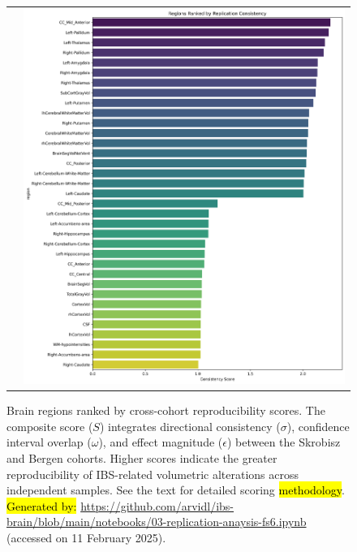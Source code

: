 \documentclass[diagnostics,article,accept,pdftex,moreauthors]{Definitions/mdpi}
\begin{document}
\begin{figure}[H]
\begin{tabular}{ll}
\hspace{-10mm} & \includegraphics[width=1\textwidth]{figs/Regions_Ranked_by_Replication_Consistency.png}
\end{tabular}
\caption{{{Brain regions ranked by cross-cohort reproducibility scores}}. {The composite score} 
 ($S$) integrates directional consistency ($\sigma$), confidence interval overlap ($\omega$), and effect magnitude ($\epsilon$) between the Skrobisz and Bergen cohorts. Higher scores indicate the greater reproducibility of IBS-related volumetric alterations across independent samples. See the text for detailed scoring \hl{methodology}. %
{\hl{Generated by:} {{\url{https://github.com/arvidl/ibs-brain/blob/main/notebooks/03-replication-anaysis-fs6.ipynb}}}} (accessed on 11 February 2025).}
\label{fig:Regions_Ranked_by_Replication_Consistency_03-notebook}
\end{figure} 
\end{document}
